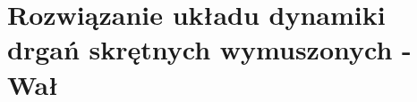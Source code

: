 \documentclass{article}%
\begin{document}
%
\normalsize%
\section{Rozwiązanie układu dynamiki drgań skrętnych wymuszonych {-} Wał}%
\label{sec:Rozwizanieukadudynamikidrgaskrtnychwymuszonych{-}Wa}%

%
\end{document}
